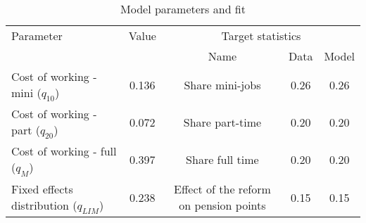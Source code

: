 \begin{table}[htbp]\caption{Model parameters and fit}\label{table:model_param}\centering\footnotesize\begin{tabular}{lcccc} \toprule  Parameter & Value & \multicolumn{3}{c}{Target statistics}  \\\cline{3-5}  &  &  Name & Data & Model  \\\midrule    Cost of working - mini ($q_{10}$)   &0.136& Share mini-jobs           & 0.26 &0.26\\ Cost of working - part ($q_{20}$)   &0.072& Share part-time           & 0.20 &0.20\\ Cost of working - full ($q_M$)      &0.397& Share full time      & 0.20 &0.20\\ Fixed effects distribution ($q_{LIM}$)   &0.238& Effect of the reform on pension points  & 0.15 & 0.15\\  \bottomrule\end{tabular}\end{table}